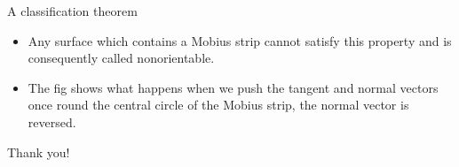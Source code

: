 \documentclass{beamer}
\begin{document}
\begin{frame}{A classification theorem}
  \begin{block}{}
    \begin{itemize}
    \item Any surface which contains a Mobius strip cannot satisfy this property and is consequently called nonorientable.
    \item The fig shows what happens when we push the tangent and normal vectors once round the central circle of the Mobius strip, the normal vector is reversed.
    \end{itemize}
  \end{block}
\end{frame}

\begin{frame}
\Huge{\centerline{Thank you!}}
\end{frame}
\end{document}

